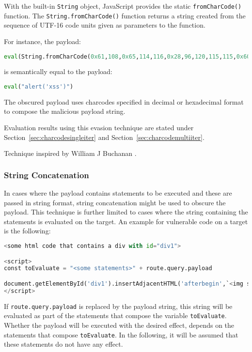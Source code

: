 With the built-in \verb|String| object, JavaScript provides the static \verb|fromCharCode()| function. The \verb|String.fromCharCode()| function returns a string created from the sequence of UTF-16 code units given as parameters to the function. \cite{js/fromCharCode}

For instance, the payload:

\begin{lstlisting}[style=basicStyle, language=Python]
eval(String.fromCharCode(0x61,108,0x65,114,116,0x28,96,120,115,115,0x60,0x29))
\end{lstlisting}
is semantically equal to the payload:

\begin{lstlisting}[style=basicStyle, language=Python]
eval("alert('xss')")
\end{lstlisting}
The obscured payload uses charcodes specified in decimal or hexadecimal format to compose the malicious payload string. 

Evaluation results using this evasion technique are stated under Section~\ref{sec:charcodesingleiter} and Section~\ref{sec:charcodemultiiter}.

Technique inspired by William J Buchanan \cite{asecsite/jsobf1}.

\subsubsection{String Concatenation}
\label{sec:stringconc}
In cases where the payload contains statements to be executed and these are passed in string format, string concatenation might be used to obscure the payload. This technique is further limited to cases where the string containing the statements is evaluated on the target. An example for vulnerable code on a target is the following:

\begin{lstlisting}[style=basicStyle, language=Python]
<some html code that contains a div with id="div1">

<script>
const toEvaluate = "<some statements>" + route.query.payload

document.getElementById('div1').insertAdjacentHTML('afterbegin',`<img src=0 onerror=${eval(toEvaluate)}>`)
</script>
\end{lstlisting}
If \verb|route.query.payload| is replaced by the payload string, this string will be evaluated as part of the statements that compose the variable \verb|toEvaluate|. Whether the payload will be executed with the desired effect, depends on the statements that compose \verb|toEvaluate|. In the following, it will be assumed that these statements do not have any effect.

